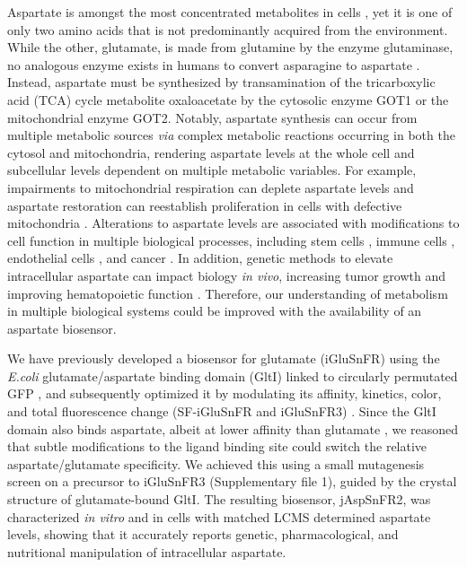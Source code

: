 \documentclass[9pt,lineno]{elife}
\begin{document}
Aspartate is amongst the most concentrated metabolites in cells \citep{Park2016-ap}, yet it is one of only two amino acids that is not predominantly acquired from the environment.
While the other, glutamate, is made from glutamine by the enzyme glutaminase, no analogous enzyme exists in humans to convert asparagine to aspartate \citep{Sullivan2018-gz}.
Instead, aspartate must be synthesized by transamination of the tricarboxylic acid (TCA) cycle metabolite oxaloacetate by the cytosolic enzyme GOT1 or the mitochondrial enzyme GOT2.
Notably, aspartate synthesis can occur from multiple metabolic sources \textit{via} complex metabolic reactions occurring in both the cytosol and mitochondria, rendering aspartate levels at the whole cell and subcellular levels dependent on multiple metabolic variables.
For example, impairments to mitochondrial respiration can deplete aspartate levels and aspartate restoration can reestablish proliferation in cells with defective mitochondria \citep{Sullivan2015-xf, Birsoy2015-pg, Cardaci2015-xy, Hart2023-gp}.
Alterations to aspartate levels are associated with modifications to cell function in multiple biological processes, including stem cells \citep{Tournaire2022-ut, Arnold2022-ft}, immune cells \citep{Bailis2019-mf}, endothelial cells \citep{Diebold2019-hh}, and cancer \citep{Helenius2021-ht}.
In addition, genetic methods to elevate intracellular aspartate can impact biology \textit{in vivo}, increasing tumor growth \citep{Sullivan2018-gz, Garcia-Bermudez2018-mj} and improving hematopoietic function \citep{Qi2021-jv}.
Therefore, our understanding of metabolism in multiple biological systems could be improved with the availability of an aspartate biosensor.

We have previously developed a biosensor for glutamate (iGluSnFR) using the \textit{E.coli} glutamate/aspartate binding domain (GltI) linked to circularly permutated GFP \citep{Marvin2013-qq}, and subsequently optimized it by modulating its affinity, kinetics, color, and total fluorescence change (SF-iGluSnFR and iGluSnFR3) \citep{Marvin2018-ks, Aggarwal2023-pi}.
Since the GltI domain also binds aspartate, albeit at lower affinity than glutamate  \citep{Hu2008-nd}, we reasoned that subtle modifications to the ligand binding site could switch the relative aspartate/glutamate specificity.
We achieved this using a small mutagenesis screen on a precursor to iGluSnFR3 (Supplementary file 1), guided by the crystal structure of glutamate-bound GltI.
The resulting biosensor, jAspSnFR2, was characterized \textit{in vitro} and in cells with matched LCMS determined aspartate levels, showing that it accurately reports genetic, pharmacological, and nutritional manipulation of intracellular aspartate.
\end{document}
